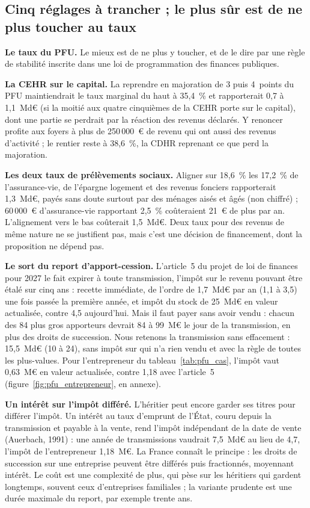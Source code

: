 \subsection{Cinq réglages à trancher ; le plus sûr est de ne plus toucher au taux}\label{sec:pfu_arbitrages}

\textbf{Le taux du PFU.} Le mieux est de ne plus y toucher, et de le dire par une règle de stabilité inscrite dans
une loi de programmation des finances publiques.

\textbf{La CEHR sur le capital.} La reprendre en majoration de 3 puis 4~points du PFU maintiendrait le taux marginal
du haut à 35,4~\% et rapporterait 0,7 à 1,1~Md€ (si la moitié aux quatre cinquièmes de la CEHR porte sur le capital),
dont une partie se perdrait par la réaction des revenus déclarés. Y renoncer profite aux foyers à plus de
250\,000~€ de revenu qui ont aussi des revenus d'activité ; le rentier reste à 38,6~\%, la CDHR reprenant ce que perd
la majoration.

\textbf{Les deux taux de prélèvements sociaux.} Aligner sur 18,6~\% les 17,2~\% de l'assurance-vie, de l'épargne
logement et des revenus fonciers rapporterait 1,3~Md€, payés sans doute surtout par des ménages aisés et âgés (non
chiffré) ; 60\,000~€ d'assurance-vie rapportant 2,5~\% coûteraient 21~€ de plus par an. L'alignement vers le bas
coûterait 1,5~Md€. Deux taux pour des revenus de même nature ne se justifient pas, mais c'est une décision de
financement, dont la proposition ne dépend pas.

\textbf{Le sort du report d'apport-cession.} L'article~5 du projet de loi de finances pour 2027 le fait expirer à
toute transmission, l'impôt sur le revenu pouvant être étalé sur cinq ans : recette immédiate, de l'ordre de
1,7~Md€ par an (1,1 à 3,5) une fois passée la première année, et impôt du stock de 25~Md€ en valeur actualisée,
contre 4,5 aujourd'hui. Mais il faut payer sans avoir vendu : chacun des 84 plus gros apporteurs devrait 84 à
99~M€ le jour de la transmission, en plus des droits de succession. Nous retenons la transmission sans effacement :
15,5~Md€ (10 à 24), sans impôt sur qui n'a rien vendu et avec la règle de toutes les plus-values. Pour
l'entrepreneur du tableau~\ref{tab:pfu_cas}, l'impôt vaut 0,63~M€ en valeur actualisée, contre 1,18 avec
l'article~5 (figure~\ref{fig:pfu_entrepreneur}, en annexe).

\textbf{Un intérêt sur l'impôt différé.} L'héritier peut encore garder ses titres pour différer l'impôt. Un intérêt
au taux d'emprunt de l'État, couru depuis la transmission et payable à la vente, rend l'impôt indépendant de la date
de vente (Auerbach, 1991) : une année de transmissions vaudrait 7,5~Md€ au lieu de 4,7, l'impôt de l'entrepreneur
1,18~M€. La France connaît le principe : les droits de succession sur une entreprise peuvent être différés puis
fractionnés, moyennant intérêt. Le coût est une complexité de plus, qui pèse sur les héritiers qui gardent
longtemps, souvent ceux d'entreprises familiales ; la variante prudente est une durée maximale du report, par
exemple trente ans.

